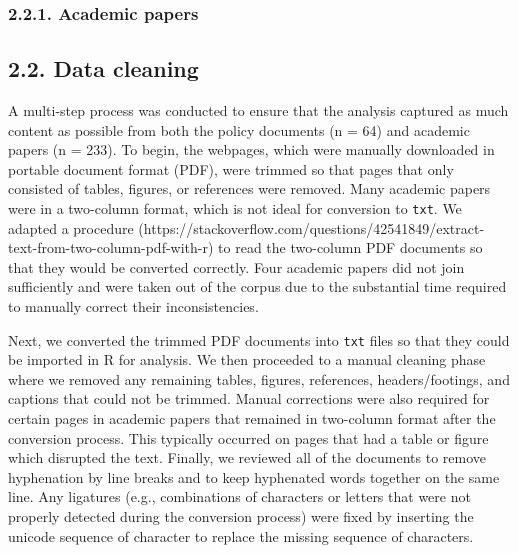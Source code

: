 \documentclass[]{elsarticle} %
\begin{document}
\begin{table}

\caption{\label{tab:policy-documents}\label{tab:search-results}Search results from the main STP stakeholder groups.}
\centering
{}
\end{table}

\hypertarget{academic-papers}{%
\subsubsection{2.2.1. Academic papers}\label{academic-papers}}

\hypertarget{data-cleaning}{%
\subsection{2.2. Data cleaning}\label{data-cleaning}}

A multi-step process was conducted to ensure that the analysis captured
as much content as possible from both the policy documents (n = 64) and
academic papers (n = 233). To begin, the webpages, which were manually
downloaded in portable document format (PDF), were trimmed so that pages
that only consisted of tables, figures, or references were removed. Many
academic papers were in a two-column format, which is not ideal for
conversion to \texttt{txt}. We adapted a procedure
(https://stackoverflow.com/questions/42541849/extract-text-from-two-column-pdf-with-r)
to read the two-column PDF documents so that they would be converted
correctly. Four academic papers did not join sufficiently and were taken
out of the corpus due to the substantial time required to manually
correct their inconsistencies.

Next, we converted the trimmed PDF documents into \texttt{txt} files so
that they could be imported in R for analysis. We then proceeded to a
manual cleaning phase where we removed any remaining tables, figures,
references, headers/footings, and captions that could not be trimmed.
Manual corrections were also required for certain pages in academic
papers that remained in two-column format after the conversion process.
This typically occurred on pages that had a table or figure which
disrupted the text. Finally, we reviewed all of the documents to remove
hyphenation by line breaks and to keep hyphenated words together on the
same line. Any ligatures (e.g., combinations of characters or letters
that were not properly detected during the conversion process) were
fixed by inserting the unicode sequence of character to replace the
missing sequence of characters.
\end{document}
